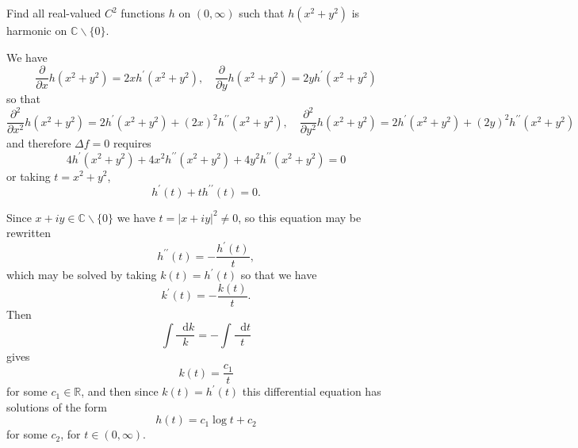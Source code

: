 \documentclass{article}
\newcommand\dif{\mathop{}\!\mathrm{d}}
\newcounter{Problem}
\newenvironment{Problem}{\begin{Exercise}[name={Problem},
                                          counter={Problem}]}
                        {\end{Exercise}}
\begin{document}
\begin{Problem}
Find all real-valued $C^2$ functions $h$ on $(0, \infty)$ such that
$h(x^2 + y^2)$ is harmonic on $\mathbb{C} \backslash \{ 0 \}$.
\end{Problem}

\begin{Answer}
We have
$$
\frac{\partial}{\partial x} h(x^2 + y^2) = 2x h^\prime(x^2 + y^2), \quad
\frac{\partial}{\partial y} h(x^2 + y^2) = 2y h^\prime(x^2 + y^2)
$$
so that
$$
  \frac{\partial^2}{\partial x^2} h(x^2 + y^2)
= 2 h^\prime(x^2 + y^2) + (2x)^2 h^{\prime\prime}(x^2 + y^2), \quad
  \frac{\partial^2}{\partial y^2} h(x^2 + y^2)
= 2 h^\prime(x^2 + y^2) + (2y)^2 h^{\prime\prime}(x^2 + y^2)
$$
and therefore $\Delta f = 0$ requires
$$
  4 h^\prime (x^2 + y^2)
+ 4x^2 h^{\prime\prime}(x^2 + y^2)
+ 4y^2 h^{\prime\prime}(x^2 + y^2) = 0
$$
or taking $t = x^2 + y^2$,
$$
h^\prime(t) + t h^{\prime\prime}(t) = 0.
$$

Since
$x + i y \in \mathbb{C} \backslash \{ 0 \}$ we have
$t = |x + iy|^2 \neq 0$,
so this equation may be rewritten
$$
h^{\prime\prime}(t) = -\frac{h^\prime(t)}{t},
$$
which may be solved by taking $k(t) = h^\prime(t)$ so that
we have
$$
k^\prime(t) = -\frac{k(t)}{t}.
$$
Then
$$
\int \frac{\dif k}{k} = -\int \frac{\dif t}{t}
$$
gives
$$
k(t) = \frac{c_1}{t}
$$
for some $c_1 \in \mathbb{R}$, and then since $k(t) = h^\prime(t)$
this differential equation has solutions of the form
$$
h(t) = c_1 \log t + c_2
$$
for some $c_2$, for $t \in (0, \infty)$.
\end{Answer}
\end{document}
